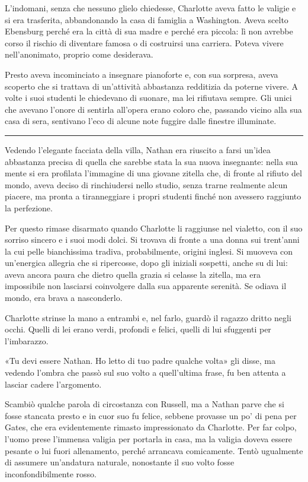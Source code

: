 \documentclass[a4paper,oneside,10pt]{memoir}
\begin{document}
L'indomani, senza che nessuno glielo chiedesse, Charlotte aveva fatto le valigie e si era trasferita, abbandonando la
casa di famiglia a Washington. Aveva scelto Ebensburg perché era la città di sua madre e perché era piccola: lì non
avrebbe corso il rischio di diventare famosa o di costruirsi una carriera. Poteva vivere nell'anonimato, proprio come
desiderava.

Presto aveva incominciato a insegnare pianoforte e, con sua sorpresa, aveva scoperto che si trattava di un'attività
abbastanza redditizia da poterne vivere. A volte i suoi studenti le chiedevano di suonare, ma lei rifiutava sempre. Gli
unici che avevano l'onore di sentirla all'opera erano coloro che, passando vicino alla sua casa di sera, sentivano l'eco
di alcune note fuggire dalle finestre illuminate.

\plainbreak{1}

Vedendo l'elegante facciata della villa, Nathan era riuscito a farsi un'idea abbastanza precisa di quella che sarebbe
stata la sua nuova insegnante: nella sua mente si era profilata l'immagine di una giovane zitella che, di fronte al
rifiuto del mondo, aveva deciso di rinchiudersi nello studio, senza trarne realmente alcun piacere, ma pronta a
tiranneggiare i propri studenti finché non avessero raggiunto la perfezione.

Per questo rimase disarmato quando Charlotte li raggiunse nel vialetto, con il suo sorriso sincero e i suoi modi dolci.
Si trovava di fronte a una donna sui trent'anni la cui pelle bianchissima tradiva, probabilmente, origini inglesi. Si
muoveva con un'energica allegria che si ripercosse, dopo gli iniziali sospetti, anche su di lui: aveva ancora paura che
dietro quella grazia si celasse la zitella, ma era impossibile non lasciarsi coinvolgere dalla sua apparente serenità.
Se odiava il mondo, era brava a nasconderlo.

Charlotte strinse la mano a entrambi e, nel farlo, guardò il ragazzo dritto negli occhi. Quelli di lei erano verdi,
profondi e felici, quelli di lui sfuggenti per l'imbarazzo.

«Tu devi essere Nathan. Ho letto di tuo padre qualche volta» gli disse, ma vedendo l'ombra che passò sul suo volto a
quell'ultima frase, fu ben attenta a lasciar cadere l'argomento.

Scambiò qualche parola di circostanza con Russell, ma a Nathan parve che si fosse stancata presto e in cuor suo fu
felice, sebbene provasse un po' di pena per Gates, che era evidentemente rimasto impressionato da Charlotte. Per far
colpo, l'uomo prese l'immensa valigia per portarla in casa, ma la valigia doveva essere pesante o lui fuori allenamento,
perché arrancava comicamente. Tentò ugualmente di assumere un'andatura naturale, nonostante il suo volto fosse
inconfondibilmente rosso.
\end{document}
